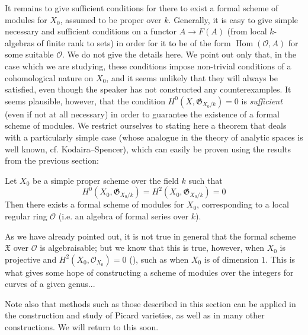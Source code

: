 It remains to give sufficient conditions for there to exist a formal scheme of modules for $X_0$, assumed to be proper over $k$.
Generally, it is easy to give simple necessary and sufficient conditions on a functor $A\to F(A)$ (from local $k$-algebras of finite rank to sets) in order for it to be of the form $\operatorname{Hom}(\mathcal{O},A)$ for some suitable $\mathcal{O}$.
We do not give the details here.
We point out only that, in the case which we are studying, these conditions impose non-trivial conditions of a cohomological nature on $X_0$, and it seems unlikely that they will always be satisfied, even though the speaker has not constructed any counterexamples.
It seems plausible, however, that the condition $H^0(X,\mathfrak{G}_{X_0/k})=0$ is \emph{sufficient} (even if not at all necessary) in order to guarantee the existence of a formal scheme of modules.
We restrict ourselves to stating here a theorem that deals with a particularly simple case (whose analogue in the theory of analytic spaces is well known, cf. Kodaira–Spencer), which can easily be proven using the results from the previous section:

\begin{theorem}\label{fga2-theorem-10}
    Let $X_0$ be a simple proper scheme over the field $k$ such that
    \[
        H^0(X_0,\mathfrak{G}_{X_0/k})
        = H^2(X_0,\mathfrak{G}_{X_0/k})
        = 0
    \]
    Then there exists a formal scheme of modules for $X_0$, corresponding to a local regular ring $\mathcal{O}$ (i.e. an algebra of formal series over $k$).
\end{theorem}

As we have already pointed out, it is not true in general that the formal scheme $\mathfrak{X}$ over $\mathcal{O}$ is algebraisable;
but we know that this is true, however, when $X_0$ is projective and $H^2(X_0,\mathcal{O}_{X_0})=0$ (), such as when $X_0$ is of dimension $1$.
This is what gives some hope of constructing a scheme of modules over the integers for curves of a given genus...

Note also that methods such as those described in this section can be applied in the construction and study of Picard varieties, as well as in many other constructions.
We will return to this soon.
